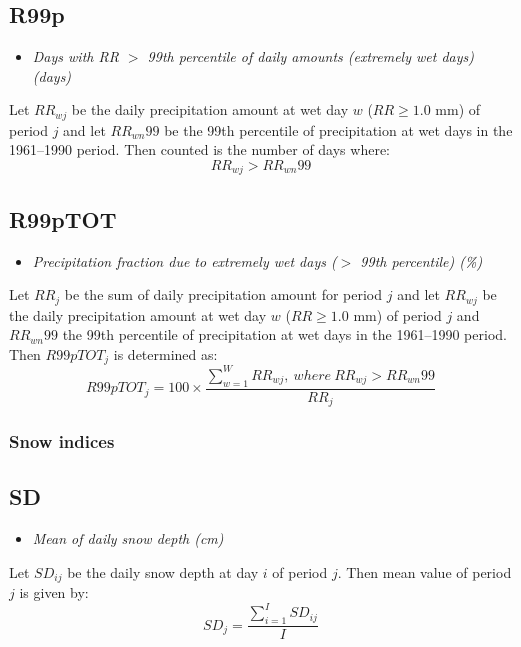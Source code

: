 \documentclass[a4paper,11pt]{article}
\begin{document}
\subsection*{R99p}
\begin{itemize}
\item \textit{Days with RR $>$ 99th percentile of daily amounts
(extremely wet days) (days)}
\end{itemize}
Let $RR_{wj}$ be the daily precipitation amount at wet day $w$
($RR\geq1.0$ mm) of period $j$ and let $RR_{wn}99$ be the 99th
percentile of precipitation at wet days in the 1961--1990 period. Then
counted is the number of days where:
\begin{equation*}
RR_{wj} > RR_{wn}99
\end{equation*}

\subsection*{R99pTOT}
\begin{itemize}
\item \textit{Precipitation fraction due to extremely wet days ($>$
99th percentile) (\%)}
\end{itemize}
Let $RR_{j}$ be the sum of daily precipitation amount for period $j$
and let $RR_{wj}$ be the daily precipitation amount at wet day $w$
($RR\geq1.0$ mm) of period $j$ and $RR_{wn}99$ the 99th percentile of
precipitation at wet days in the 1961--1990 period. Then $R99pTOT_{j}$
is determined as:
\begin{equation*}
R99pTOT_{j} = 100 \times \frac{\sum_{w=1}^{W}RR_{wj},\:where\:
RR_{wj}>RR_{wn}99}{RR_{j}}
\end{equation*}

\subsubsection{Snow indices}

\subsection*{SD}
\begin{itemize}
\item \textit{Mean of daily snow depth (cm)}
\end{itemize}
Let $SD_{ij}$ be the daily snow depth at day $i$ of period $j$. Then
mean value of period $j$ is given by:
\begin{equation*}
SD_j = \frac{\sum^{I}_{i=1}SD_{ij}}{I}
\end{equation*}
\end{document}
